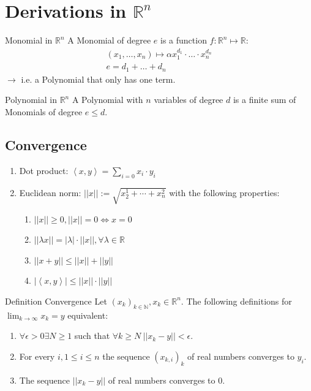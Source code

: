 \documentclass[a4paper,fontsize = 8pt]{scrartcl}
\def\R{\mathbb{R}}
\begin{document}
\section{Derivations in \texorpdfstring{\(\R^n\)}{Rⁿ}}
\begin{subbox}{Monomial in $\R^n$}
  A Monomial of degree \(e\) is a function $f: \R^n \mapsto \R:$
  \begin{align*}
    (x_1, \ldots, x_n) \mapsto \alpha x_1^{d_1}\cdot \ldots \cdot x_n^{d_n} \\
    e = d_1 + \ldots + d_n 
  \end{align*}
  \(\to\) i.e. a Polynomial that only has one term.
\end{subbox}
\begin{mainbox}{Polynomial in $\R^n$}
  A Polynomial with \(n\) variables of degree \(d\) is a finite sum of Monomials of degree \(e \le d\).
\end{mainbox}

\subsection{Convergence}
\begin{enumerate}
  \item Dot product: \(\left< x,y\right> = \sum_{i=0} x_i \cdot y_i\)
  \item Euclidean norm: \(||x|| := \sqrt{x_2^1 + \cdots + x_n^2}\) with the following properties:
  \begin{enumerate}
    \item \(||x|| \ge 0, ||x|| = 0 \iff x = 0\)
    \item \(||\lambda x|| = |\lambda| \cdot ||x||, \forall \lambda \in \R\)
    \item \(||x+y|| \le ||x|| + ||y||\)
    \item \(|\left<x,y\right>| \le ||x|| \cdot ||y||\)
  \end{enumerate}
\end{enumerate}

\begin{mainbox}{Definition Convergence}
  Let \((x_k)_{k \in \mathbb{N}}, x_k \in \R^n\). The following definitions for \(\lim_{k\to\infty}x_k = y\) equivalent:
  \begin{enumerate}
    \item \(\forall \epsilon > 0 \exists N \ge 1\) such that \(\forall k \ge N \ ||x_k - y|| < \epsilon\).
    \item For every \(i, 1 \le i \le n\) the sequence \((x_{k,i})_k\) of real numbers converges to \(y_i\).
    \item The sequence \(||x_k - y||\) of real numbers converges to \(0\).
  \end{enumerate}
\end{mainbox}
\end{document}
